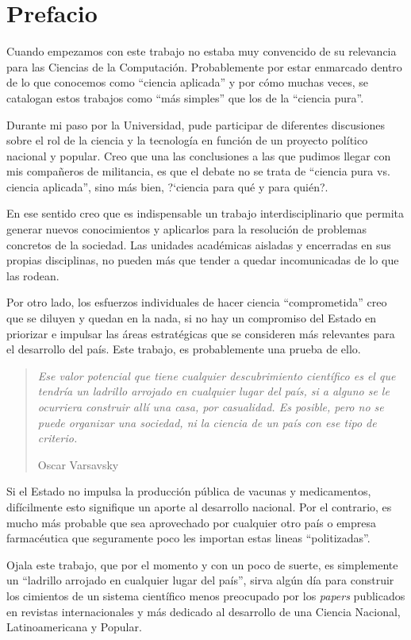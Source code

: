 \chapter*{Prefacio}

Cuando empezamos con este trabajo no estaba muy convencido de su relevancia
para las Ciencias de la Computaci\'on. Probablemente por estar enmarcado dentro
de lo que conocemos como ``ciencia aplicada'' y por c\'omo muchas veces, se
catalogan estos trabajos como ``m\'as simples'' que los de la ``ciencia pura''.

Durante mi paso por la Universidad, pude participar de diferentes discusiones
sobre el rol de la ciencia y la tecnolog\'ia en funci\'on de un proyecto
pol\'itico nacional y popular. Creo que una las conclusiones a las que pudimos
llegar con mis compa\~neros de militancia, es que el debate no se trata de
``ciencia pura vs. ciencia aplicada'', sino m\'as bien, ?`ciencia para qu\'e y
para qui\'en?.

En ese sentido creo que es indispensable un trabajo interdisciplinario que
permita generar nuevos conocimientos y aplicarlos para la resoluci\'on de
problemas concretos de la sociedad. Las unidades acad\'emicas aisladas y
encerradas en sus propias disciplinas, no pueden m\'as que tender a quedar
incomunicadas de lo que las rodean.

Por otro lado, los esfuerzos individuales de hacer ciencia ``comprometida''
creo que se diluyen y quedan en la nada, si no hay un compromiso del Estado en
priorizar e impulsar las \'areas estrat\'egicas que se consideren m\'as
relevantes para el desarrollo del pa\'is. Este trabajo, es probablemente una
prueba de ello.

\begin{quotation}
 \em Ese valor potencial que tiene cualquier descubrimiento cient\'ifico es el
que tendr\'ia un ladrillo arrojado en cualquier lugar del pa\'is, si a alguno se
le ocurriera construir all\'i una casa, por casualidad. Es posible, pero no se
puede organizar una sociedad, ni la ciencia de un pa\'is con ese tipo de
criterio.
\begin{flushright}
Oscar Varsavsky
\end{flushright}
\end{quotation}

Si el Estado no impulsa la producci\'on p\'ublica de vacunas y medicamentos,
dif\'icilmente esto signifique un aporte al desarrollo nacional. Por el
contrario, es mucho m\'as probable que sea aprovechado por cualquier otro pa\'is
o empresa farmac\'eutica que seguramente poco les importan estas lineas
``politizadas''.

Ojala este trabajo, que por el momento y con un poco de suerte, es simplemente
un ``ladrillo arrojado en cualquier lugar del pa\'is'', sirva alg\'un d\'ia para
construir los cimientos de un sistema cient\'ifico menos preocupado por los
\textit{papers} publicados en revistas internacionales y m\'as dedicado al
desarrollo de una Ciencia Nacional, Latinoamericana y Popular.
